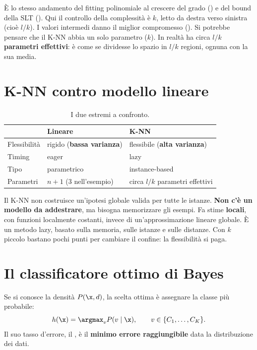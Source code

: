 È lo stesso andamento del fitting polinomiale al crescere del grado () e del bound della
SLT (). Qui il controllo della complessità è $k$, letto da destra verso sinistra (cioè
$l/k$). I valori intermedi danno il miglior compromesso (). Si potrebbe pensare che il
K-NN abbia un solo parametro ($k$). In realtà ha circa \textbf{$l/k$ parametri effettivi}: è come se dividesse lo
spazio in $l/k$ regioni, ognuna con la sua media.

\section{K-NN contro modello lineare}

\begin{table}[ht]
\centering\small
\caption{I due estremi a confronto.}
\begin{tabular}{lll}
\toprule
 & Lineare & K-NN \\
\midrule
Flessibilità & rigido (\textbf{bassa varianza}) & flessibile (\textbf{alta varianza}) \\
Timing & eager & lazy \\
Tipo & parametrico & instance-based \\
Parametri & $n+1$ (3 nell'esempio) & circa $l/k$ parametri effettivi \\
\bottomrule
\end{tabular}
\end{table}

Il K-NN non costruisce un'ipotesi globale valida per tutte le istanze. \textbf{Non c'è un modello da
addestrare}, ma bisogna memorizzare gli esempi. Fa stime \textbf{locali}, con funzioni localmente costanti,
invece di un'approssimazione lineare globale. È un metodo lazy, basato sulla memoria, sulle istanze e sulle
distanze. Con $k$ piccolo bastano pochi punti per cambiare il confine: la flessibilità si paga.

\section{Il classificatore ottimo di Bayes}
\label{sec:bayes}

\begin{definizione}
Se si conosce la densità $P(\x,d)$, la scelta ottima è assegnare la classe più probabile:
\[
h(\x) = \argmax_v P(v\mid\x),\qquad v\in\{C_1,\dots,C_K\}.
\]
Il suo tasso d'errore, il , è il \textbf{minimo errore raggiungibile} data la distribuzione
dei dati.
\end{definizione}

